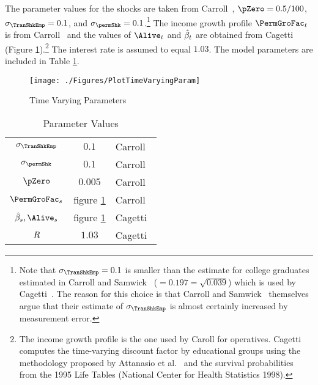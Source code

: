 The parameter values for the shocks are taken from Carroll~\citeyearpar{carroll:brookings}, $\pZero=0.5/100$, $\sigma _{\TranShkEmp }=0.1$, and $\sigma_{\permShk}=0.1$.\footnote{Note that $\sigma _{\TranShkEmp}=0.1$ is smaller than the estimate for college graduates estimated in
  Carroll and Samwick~\citeyearpar{carroll&samwick:nature} ($=0.197=\sqrt{0.039}$) which is used by Cagetti~\citeyearpar{cagettiWprofiles}. The reason for this choice is that Carroll and Samwick~\citeyearpar{carroll&samwick:nature} themselves argue that their estimate of $\sigma_{\TranShkEmp }$ is almost certainly increased by measurement error.} The income growth profile $\PermGroFac_{\prd}$ is from Carroll~\citeyearpar{carrollBSLCPIH} and the values of $\Alive_{\prd}$ and $\hat{\beta}_{t}$ are obtained from Cagetti~\citeyearpar{cagettiWprofiles} (Figure \ref{fig:TimeVaryingParam}).\footnote{The income growth profile is the one used by Caroll for operatives. Cagetti computes the time-varying discount factor by educational groups using the methodology proposed by Attanasio et al.~\citeyearpar{AttanasioBanksMeghirWeber} and the survival probabilities from the 1995 Life Tables (National Center for Health Statistics 1998).} The interest rate is assumed to equal $1.03$. The model parameters are included in Table \ref{table:StrEstParams}.

\hypertarget{PlotTimeVaryingParam}{}
\begin{figure}[h]
  \texttt{[image: ./Figures/PlotTimeVaryingParam]}
  \caption{Time Varying Parameters}
  \label{fig:TimeVaryingParam}
\end{figure}

\begin{table}[h]
  \caption{Parameter Values}\label{table:StrEstParams}
  \begin{center}
    \begin{tabular}{ccl}
      \hline\hline
      $\sigma _{\TranShkEmp}$    & $0.1$ & Carroll~\citeyearpar{carroll:brookings}
      \\ $\sigma _{\permShk}$   & $0.1$ & Carroll~\citeyearpar{carroll:brookings}
      \\ $\pZero$           & $0.005$  & Carroll~\citeyearpar{carroll:brookings}
      \\ $\PermGroFac_{s}$        & figure \ref{fig:TimeVaryingParam} & Carroll~\citeyearpar{carrollBSLCPIH}
      \\ $\hat{\DiscFac}_{s},\Alive_{s}$ & figure \ref{fig:TimeVaryingParam} & Cagetti~\citeyearpar{cagettiWprofiles}
      \\$R$            & $1.03$  & Cagetti~\citeyearpar{cagettiWprofiles}\\
      \hline
    \end{tabular}
  \end{center}
\end{table}

